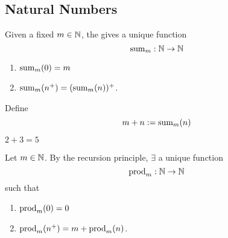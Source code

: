 \documentclass[12pt]{article}
\begin{document}
\subsection{Natural Numbers}

\begin{defn} \label{defn:N:addition}
    Given a fixed $m \in \mathbb{N}$, the  gives a unique function \[
        \mathrm{sum}_{m} : \mathbb{N} \to \mathbb{N}
    \]
    \begin{enumerate}[label=(A\arabic*)]
        \item\label{defn:N:addition:zero} $\mathrm{sum}_{m}({0}) = m$ 
        \item\label{defn:N:addition:recursion} $\mathrm{sum}_{m}({n^{+}}) = (\mathrm{sum}_{m}({n}))^{+}$.
    \end{enumerate}
    Define \[
        m + n := \mathrm{sum}_{m}({n})
    \]
\end{defn}

\begin{prop} \label{thm:N:2+3=5}
    $2 + 3 = 5$
\end{prop}

\begin{defn} \label{defn:N:multiplication}
    Let $m \in \mathbb{N}$. By the recursion principle, $\exists$ a unique function \[
        \mathrm{prod}_{m} : \mathbb{N} \to \mathbb{N}
    \]
    such that
    \begin{enumerate}[label=(\alph*)]
        \item\label{defn:N:multiplication:zero} $\mathrm{prod}_{m}({0}) = 0$
        \item\label{defn:N:multiplication:recursion} $\mathrm{prod}_{m}({n^{+}}) = m + \mathrm{prod}_{m}({n})$.
    \end{enumerate}
\end{defn}
\end{document}
